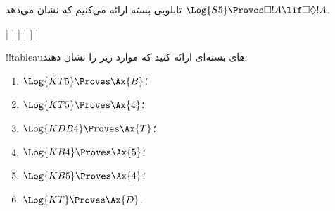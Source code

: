 \documentclass[../../../include/open-logic-section]{subfiles}
\begin{document}
\begin{ex}
  تابلویی بسته ارائه می‌کنیم که نشان می‌دهد
  $\Log{S5} \Proves \Box!A \lif \Box\Diamond!A$.
  \begin{oltableau}
    [\pFmla{\False}{\Box\formula{A} \lif \Box\Diamond \formula{A}}{1},
      just = \TAss
      [\pFmla{\True}{\Box \formula{A}}{1}, just = {\TRule{\False}{\lif}[1]}
        [\pFmla{\False}{\Box\Diamond \formula{A}}{1},
          just = {\TRule{\False}{\lif}[1]}
          [\pFmla{\False}{\Diamond \formula{A}}{1.1},
            just = {\TRule{\False}{\Box}[3]}
            [\pFmla{\False}{\Diamond \formula{A}}{1},
              just = {4r$\Diamond$ 4}
              [\pFmla{\False}{\formula{A}}{1.1},
                just = {\TRule{\False}{\Diamond}[5]}
                [\pFmla{\True}{\formula{A}}{1.1},
                  just = {\TRule{\True}{\Box}[2]}, close]
              ]
            ]
          ]
        ]
      ]
    ]
  \end{oltableau}
\end{ex}

\begin{prob}
!!{tableau}های بسته‌ای ارائه کنید که موارد زیر را نشان دهند:
  \begin{enumerate}
  \item $\Log{KT5} \Proves \Ax{B}$؛
  \item $\Log{KT5} \Proves \Ax{4}$؛
  \item $\Log{KDB4} \Proves \Ax{T}$؛
  \item $\Log{KB4} \Proves \Ax{5}$؛
  \item $\Log{KB5} \Proves \Ax{4}$؛
  \item $\Log{KT} \Proves \Ax{D}$.
  \end{enumerate}
\end{prob}
\end{document}
